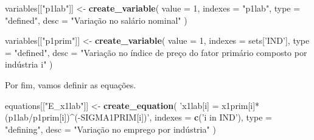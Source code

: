 \documentclass[12pt,twoside]{article}
\newenvironment{Shaded}{\begin{snugshade}}{\end{snugshade}}
\newcommand{\DataTypeTok}[1]{\textcolor[rgb]{0.13,0.29,0.53}{#1}}
\newcommand{\DecValTok}[1]{\textcolor[rgb]{0.00,0.00,0.81}{#1}}
\newcommand{\KeywordTok}[1]{\textcolor[rgb]{0.13,0.29,0.53}{\textbf{#1}}}
\newcommand{\NormalTok}[1]{#1}
\newcommand{\StringTok}[1]{\textcolor[rgb]{0.31,0.60,0.02}{#1}}
\let\oldShaded\Shaded
\let\endoldShaded\endShaded
\renewenvironment{Shaded}{\footnotesize\oldShaded}{\endoldShaded}
\begin{document}
\begin{Shaded}
\begin{Highlighting}[]
\NormalTok{variables[[}\StringTok{"p1lab"}\NormalTok{]] <-}\StringTok{ }\KeywordTok{create_variable}\NormalTok{(}
  \DataTypeTok{value =} \DecValTok{1}\NormalTok{,}
  \DataTypeTok{indexes =} \StringTok{"p1lab"}\NormalTok{,}
  \DataTypeTok{type =} \StringTok{"defined"}\NormalTok{,}
  \DataTypeTok{desc =} \StringTok{"Variação no salário nominal"}
\NormalTok{)}


\NormalTok{variables[[}\StringTok{"p1prim"}\NormalTok{]] <-}\StringTok{ }\KeywordTok{create_variable}\NormalTok{(}
  \DataTypeTok{value =} \DecValTok{1}\NormalTok{,}
  \DataTypeTok{indexes =}\NormalTok{ sets[}\StringTok{'IND'}\NormalTok{],}
  \DataTypeTok{type =} \StringTok{"defined"}\NormalTok{,}
  \DataTypeTok{desc =} \StringTok{"Variação no índice de preço do fator primário composto por indústria i"}
\NormalTok{)}
\end{Highlighting}
\end{Shaded}

Por fim, vamos definir as equações.

\begin{Shaded}
\begin{Highlighting}[]
\NormalTok{equations[[}\StringTok{"E_x1lab"}\NormalTok{]] <-}\StringTok{ }\KeywordTok{create_equation}\NormalTok{(}
  \StringTok{'x1lab[i] = x1prim[i]*(p1lab/p1prim[i])^(-SIGMA1PRIM[i])'}\NormalTok{,}
  \DataTypeTok{indexes =} \KeywordTok{c}\NormalTok{(}\StringTok{'i in IND'}\NormalTok{),}
  \DataTypeTok{type =} \StringTok{"defining"}\NormalTok{,}
  \DataTypeTok{desc =} \StringTok{"Variação no emprego por indústria"}
\StringTok{)}
\end{Highlighting}
\end{Shaded}
\end{document}
